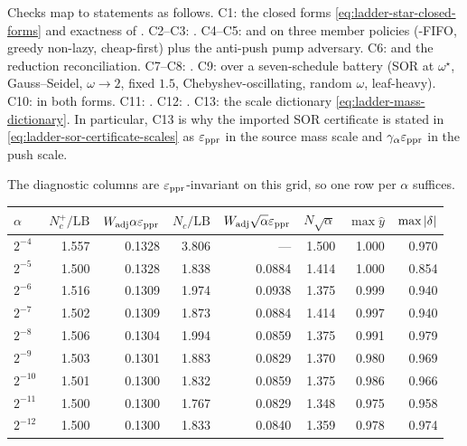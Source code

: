 Checks map to statements as follows. C1: the closed forms
\eqref{eq:ladder-star-closed-forms} and exactness of
. C2--C3:
. C4--C5:
 and
 on three member policies
(\APPR{}-FIFO, greedy non-lazy, cheap-first) plus the anti-push pump
adversary. C6:  and the reduction reconciliation.
C7--C8: . C9:
 over a seven-schedule battery
(SOR at $\omega^{\star}$, Gauss--Seidel, $\omega\to2$, fixed $1.5$,
Chebyshev-oscillating, random $\omega$, leaf-heavy). C10:
 in both forms. C11:
. C12:
. C13: the scale dictionary
\eqref{eq:ladder-mass-dictionary}. In particular, C13 is why the imported SOR
certificate is stated in \eqref{eq:ladder-sor-certificate-scales} as
$\varepsilon_{\mathrm{ppr}}$ in the source mass scale and $\gamma_{\alpha}\varepsilon_{\mathrm{ppr}}$ in the push scale.

The diagnostic columns are $\varepsilon_{\mathrm{ppr}}$-invariant on this grid, so one row per
$\alpha$ suffices.

\begin{center}
\begin{tabular}{@{}lrrrrrrr@{}}
\toprule
$\alpha$ & $N_{c}^{+}/\mathrm{LB}$ & $W_{\mathrm{adj}}\alpha\varepsilon_{\mathrm{ppr}}$
    & $N_{c}/\mathrm{LB}$ & $W_{\mathrm{adj}}\sqrt\alpha\varepsilon_{\mathrm{ppr}}$
    & $N\sqrt\alpha$ & $\max\widehat y$ & $\max\left\lvert \delta \right\rvert$ \\
\midrule
$2^{-4}$  & 1.557 & 0.1328 & 3.806 & ---    & 1.500 & 1.000 & 0.970 \\
$2^{-5}$  & 1.500 & 0.1328 & 1.838 & 0.0884 & 1.414 & 1.000 & 0.854 \\
$2^{-6}$  & 1.516 & 0.1309 & 1.974 & 0.0938 & 1.375 & 0.999 & 0.940 \\
$2^{-7}$  & 1.502 & 0.1309 & 1.873 & 0.0884 & 1.414 & 0.997 & 0.940 \\
$2^{-8}$  & 1.506 & 0.1304 & 1.994 & 0.0859 & 1.375 & 0.991 & 0.979 \\
$2^{-9}$  & 1.503 & 0.1301 & 1.883 & 0.0829 & 1.370 & 0.980 & 0.969 \\
$2^{-10}$ & 1.501 & 0.1300 & 1.832 & 0.0859 & 1.375 & 0.986 & 0.966 \\
$2^{-11}$ & 1.500 & 0.1300 & 1.767 & 0.0829 & 1.348 & 0.975 & 0.958 \\
$2^{-12}$ & 1.500 & 0.1300 & 1.833 & 0.0840 & 1.359 & 0.978 & 0.974 \\
\bottomrule
\end{tabular}
\end{center}

